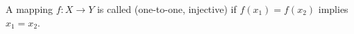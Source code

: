 A mapping $f: X \rightarrow Y$ is called  (one-to-one, injective) if $f(x_1) = f(x_2)$ implies $x_1 = x_2$.
